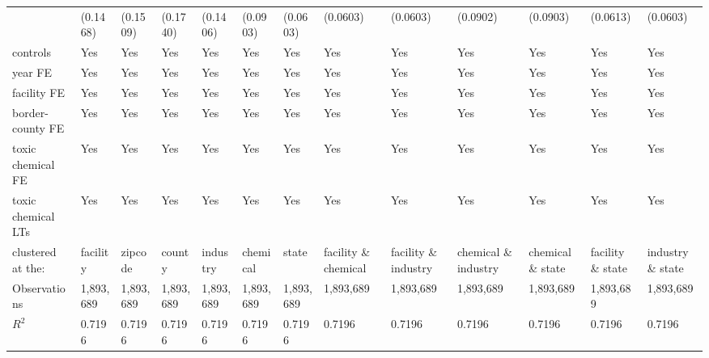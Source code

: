\begin{table}[H]
{\begin{tabular}{@{}lllllllllllll@{}}
            & (0.1468)  & (0.1509)  & (0.1740)  & (0.1406)  & (0.0903)  & (0.0603)  & (0.0603)             & (0.0603)             & (0.0902)             & (0.0903)          & (0.0613)          & (0.0603)          \\
            controls                       & Yes       & Yes       & Yes       & Yes       & Yes       & Yes       & Yes                  & Yes                  & Yes                  & Yes               & Yes               & Yes               \\
            year FE                        & Yes       & Yes       & Yes       & Yes       & Yes       & Yes       & Yes                  & Yes                  & Yes                  & Yes               & Yes               & Yes               \\
            facility FE                    & Yes       & Yes       & Yes       & Yes       & Yes       & Yes       & Yes                  & Yes                  & Yes                  & Yes               & Yes               & Yes               \\
            border-county FE               & Yes       & Yes       & Yes       & Yes       & Yes       & Yes       & Yes                  & Yes                  & Yes                  & Yes               & Yes               & Yes               \\
            toxic chemical FE              & Yes       & Yes       & Yes       & Yes       & Yes       & Yes       & Yes                  & Yes                  & Yes                  & Yes               & Yes               & Yes               \\
            toxic chemical LTs             & Yes       & Yes       & Yes       & Yes       & Yes       & Yes       & Yes                  & Yes                  & Yes                  & Yes               & Yes               & Yes               \\ \midrule
            clustered at the:              & facility  & zipcode   & county    & industry  & chemical  & state     & facility \& chemical & facility \& industry & chemical \& industry & chemical \& state & facility \& state & industry \& state \\
            Observations                   & 1,893,689 & 1,893,689 & 1,893,689 & 1,893,689 & 1,893,689 & 1,893,689 & 1,893,689            & 1,893,689            & 1,893,689            & 1,893,689         & 1,893,689         & 1,893,689         \\
            $R^2$                          & 0.7196    & 0.7196    & 0.7196    & 0.7196    & 0.7196    & 0.7196    & 0.7196               & 0.7196               & 0.7196               & 0.7196            & 0.7196            & 0.7196            \\ \bottomrule \bottomrule

\end{tabular}}
\end{table}

